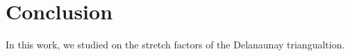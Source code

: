 \chapter{Conclusion}
In this work, we studied on the stretch factors of the Delanaunay triangualtion. 